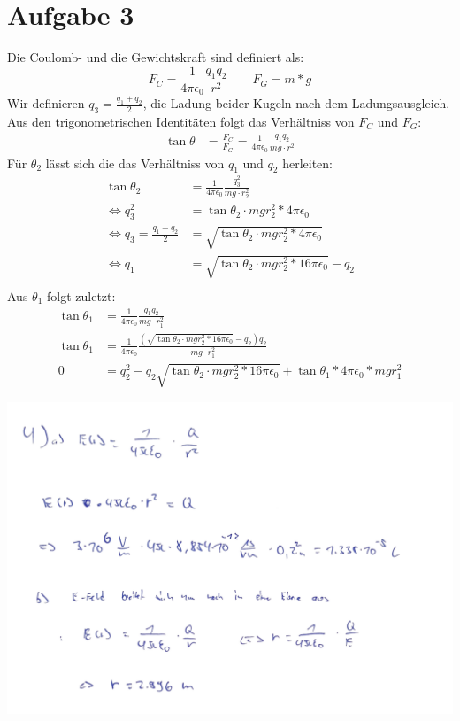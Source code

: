 \documentclass[a4paper]{article}
\newcommand{\kco}{\frac{1}{4\pi\epsilon_0}}
\begin{document}
\section*{Aufgabe 3}
Die Coulomb- und die Gewichtskraft sind definiert als:
\[
	F_C = \kco \frac{q_1q_2}{r^2} \qquad F_G = m*g
\]
Wir definieren $q_3 = \frac{q_1 + q_2}{2} $, die Ladung  beider Kugeln nach dem Ladungsausgleich. Aus den trigonometrischen Identitäten folgt das Verhältniss von $F_C$ und $F_G$:
\begin{align*}
	\tan \theta &= \frac{F_C}{F_G} =  \kco \frac{q_1q_2}{mg \cdot r^2}
\end{align*}
Für $\theta_2$ lässt sich die das Verhältniss von $q_1$ und $q_2$ herleiten:
\begin{align*}
	\tan \theta_2 &= \kco \frac{q_3^2}{mg \cdot r_2^2} \\
	\Leftrightarrow
	q_3^2 &= \tan \theta_2 \cdot mg r_2^2 * 4\pi\epsilon_0 \\
	\Leftrightarrow
	q_3 = \frac{q_1 + q_2}{2} &= \sqrt{\tan \theta_2 \cdot mg r_2^2 * 4\pi\epsilon_0} \\
	\Leftrightarrow
	q_1 &= \sqrt{\tan \theta_2 \cdot mg r_2^2 * 16\pi\epsilon_0} - q_2 \\
\end{align*}
Aus $\theta_1$ folgt zuletzt:
\begin{align*}
	\tan \theta_1 &= \kco \frac{q_1q_2}{mg \cdot r_1^2} \\
	\tan \theta_1 &= \kco \frac{ \left( \sqrt{\tan \theta_2 \cdot mg r_2^2 * 16\pi\epsilon_0} - q_2 \right) q_2}{mg \cdot r_1^2} \\
	0 &= q_2^2 - q_2 \sqrt{\tan \theta_2 \cdot mg r_2^2 * 16\pi\epsilon_0}  + \tan \theta_1 * 4\pi\epsilon_0	*mg r_1^2 
\end{align*}


\includegraphics[width=15cm]{4.jpg}
\end{document}
